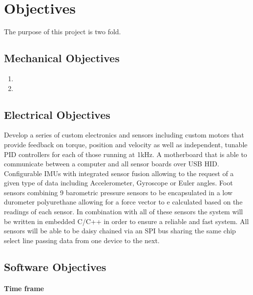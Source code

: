 \section{Objectives}
The purpose of this project is two fold.
\subsection{Mechanical Objectives}
\begin{enumerate}
  \item{}
  \item{}
\end{enumerate}

\subsection{Electrical Objectives}
Develop a series of custom electronics and sensors including custom motors that provide feedback on torque, position and velocity as well as independent, tunable PID controllers for each of those running at 1kHz\+. A motherboard that is able to communicate between a computer and all sensor boards over USB HID. Configurable IMUs with integrated sensor fusion allowing to the request of a given type of data including Accelerometer, Gyroscope or Euler angles. Foot sensors combining 9 barometric pressure sensors to be encapsulated in a low durometer polyurethane allowing for a force vector to e calculated based on the readings of each sensor. 
In combination with all of these sensors the system will be written in embedded C/C++ in order to ensure a reliable and fast system. All sensors will be able to be daisy chained via an SPI bus sharing the same chip select line passing data from one device to the next. 
\subsection{Software Objectives}

\paragraph{Time frame}
